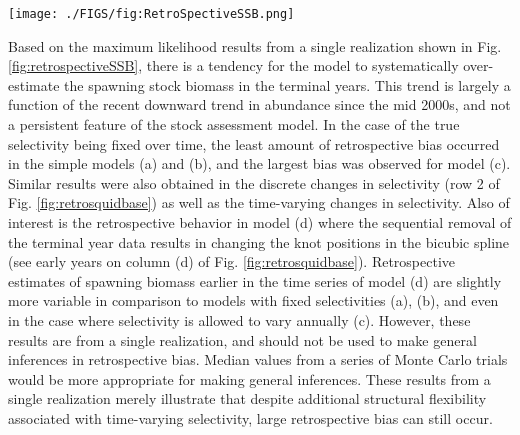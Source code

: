 \begin{figure*}[!tbh]
	\begin{center}
		\texttt{[image: ./FIGS/fig:RetroSpectiveSSB.png]}
	\end{center}
	\caption{One realization of retrospective estimates of spawning biomass for simulated Pacific hake populations where four years of data was sequentially removed from.  The true spawning biomass used to simulated the data is included for reference.}
	\label{fig:retrospectiveSSB}
\end{figure*}

Based on the maximum likelihood results from a single realization shown in Fig. \ref{fig:retrospectiveSSB}, there is a tendency for the model to systematically over-estimate the spawning stock biomass in the terminal years.  This trend is largely a function of the recent downward trend in abundance since the mid 2000s, and not a persistent feature of the stock assessment model.  In the case of the true selectivity being fixed over time, the least amount of retrospective bias occurred in the simple models (a) and (b), and the largest bias was observed for model (c).  Similar results were also obtained in the discrete changes in selectivity (row 2 of Fig. \ref{fig:retrosquidbase}) as well as the time-varying changes in selectivity.  Also of interest is the retrospective behavior in model (d) where the sequential removal of the terminal year data results in changing the knot positions in the bicubic spline (see early years on column (d) of Fig. \ref{fig:retrosquidbase}). Retrospective  estimates of spawning biomass earlier in the time series of model (d) are slightly more variable in comparison to models with fixed selectivities (a), (b), and even in the case where selectivity is allowed to vary annually (c).  However, these results are from a single realization, and should not be used to make general inferences in retrospective bias.  Median values from a series of Monte Carlo trials would be more appropriate for making general inferences.  These results from a single realization merely illustrate that despite additional structural flexibility associated with time-varying selectivity, large retrospective bias can still occur. 




